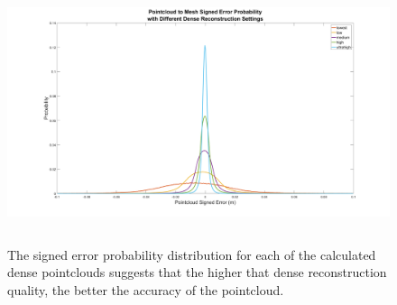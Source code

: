 \begin{figure}[H]
	\centering
	\includegraphics[height = 3in]{../fig/histerror}

	\caption{The signed error probability distribution for each of the calculated dense pointclouds suggests that the higher that dense reconstruction quality, the better the accuracy of the pointcloud.}
	\label{fig:hist}
\end{figure}